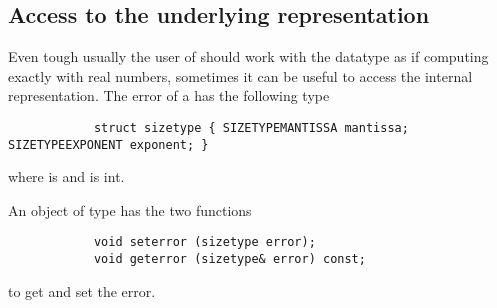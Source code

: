 	\subsection{Access to the underlying representation}
		Even tough usually the user of \irram should work with the datatype \real
		as if computing exactly with real numbers, sometimes it can be useful to access the internal representation.
		The error of a \real has the following type
		\begin{verbatim}
			struct sizetype { SIZETYPEMANTISSA mantissa; SIZETYPEEXPONENT exponent; }
		\end{verbatim}
		where  is  and  is int.
		
		An object of type \real has the two functions
		\begin{verbatim}
			void seterror (sizetype error);
			void geterror (sizetype& error) const;
		\end{verbatim}
		to get and set the error.
